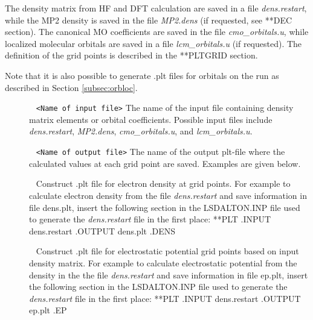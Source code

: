 The density matrix from HF and DFT calculation are saved in a file \emph{dens.restart}, while the MP2 density is saved in the file \emph{MP2.dens} (if requested, see **DEC section).
The canonical MO coefficients are saved in the file \emph{cmo\_orbitals.u}, while localized molecular orbitals are saved in a file \emph{lcm\_orbitals.u} (if requested).
The definition of the grid points is described in the **PLTGRID section.

Note that it is also possible to generate .plt files for orbitals on the run as described in Section \ref{subsec:orbloc}.

\begin{description}
\item[] \verb| | \newline
\verb|<Name of input file>| \newline
The name of the input file containing density matrix elements or orbital coefficients. Possible input files include \emph{dens.restart}, \emph{MP2.dens}, \emph{cmo\_orbitals.u}, and \emph{lcm\_orbitals.u}.

\item[] \verb| | \newline
\verb|<Name of output file>| \newline
The name of the output plt-file where the calculated values at each grid point are saved. Examples are given below.

\item[]\verb| | \newline
Construct .plt file for electron density at grid points.
For example to calculate electron density from the file  \emph{dens.restart} and save information in file  dens.plt,
insert the following section in the LSDALTON.INP file used to generate the  \emph{dens.restart} file in the first place:
 \newline
**PLT \newline
.INPUT \newline
dens.restart \newline
.OUTPUT \newline
dens.plt \newline
.DENS \newline

\item[]\verb| | \newline
Construct .plt file for electrostatic potential grid points based on input density matrix.
For example to calculate electrostatic potential from the density in the the file  \emph{dens.restart} and save information in file  ep.plt,
insert the following section in the LSDALTON.INP file used to generate the  \emph{dens.restart} file in the first place:
 \newline
**PLT \newline
.INPUT \newline
dens.restart \newline
.OUTPUT \newline
ep.plt \newline
.EP \newline



\end{description}
